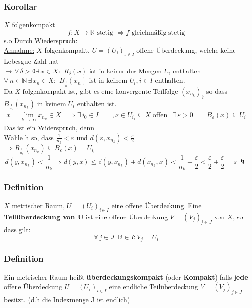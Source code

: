  \subsubsection{Korollar} %
 \label{ssub:korollar}
 $X$ folgenkompakt
 \[
 	f:X \to \mathbb{R} \text{ stetig } \Rightarrow f \text{ gleichmäßig stetig} 
 \]
  s.o
 Durch Wiederspruch: \\
 \underline{Annahme:} $X$ folgenkompakt, $U=(U_i)_{i \in I}$ offene Überdeckung, welche keine Lebesgue-Zahl hat \\
 $\Rightarrow \forall\, \delta >0 \exists\, x \in X:$ $B_{\delta}(x)$ ist in keiner der Mengen $U_i$ enthalten \\
 $\forall\, n \in \mathbb{N} \, \exists\, x_n \in X:$ $B_{\frac{1}{n}}(x_n)$ ist in keinem $U_i, i \in I$ enthalten. \\
 Da $X$ folgenkompakt ist, gibt es eine konvergente Teilfolge $(x_{n_k})_k$ so dass $B_{\frac{1}{n_k}}(x_{n_k})$ in keinem $U_i$ enthalten ist.
 \begin{align*}
 	x = \lim_{k \to \infty}x_{n_k} \in X & \Rightarrow \exists\,i_0 \in I \qquad ,x \in U_{i_0} \subseteq X \text{ offen}
	& \exists\,\varepsilon>0 \qquad B_{\varepsilon}(x) \subseteq U_{i_0}
 \end{align*}  
 Das ist ein Widerspruch, denn \\
 Wähle h so, dass $\frac{1}{n_k}< \varepsilon$ und $d(x,x_{n_k}) < \frac{\varepsilon}{2}$ \\
 $\Rightarrow B_{\frac{1}{n_k}}(x_{n_k}) \subseteq B_{\varepsilon}(x)=U_{i_0}$
 \[
 	d(y,x_{n_k})<\frac{1}{n_k} \Rightarrow d(y,x) \leq d(y,x_{n_k})+d(x_{n_k},x) < \frac{1}{n_k}+\frac{\varepsilon}{2} < \frac{\varepsilon}{2}+ \frac{\varepsilon}{2} = \varepsilon \,  \lightning
 \]
\subsubsection{Definition} %
\label{ssub:definition}
$X$ metrischer Raum, $U=(U_i)_{i \in I}$ eine offene Überdeckung. Eine {\bfseries Teilüberdeckung von U} ist eine offene Überdeckung $V=(V_j)_{j \in J}$ von $X$, so dass gilt: 
\[
	\forall\, j \in J \,\exists\,i \in I: V_j = U_i
\]
\subsubsection{Definition} %
\label{ssub:definition}
Ein metrischer Raum heißt {\bfseries überdeckungskompakt} (oder {\bfseries Kompakt}) falls {\bfseries jede} offene Überdeckung $U=(U_i)_{i \in I}$ eine endliche Teilüberdeckung $V=(V_j)_{j \in J}$ besitzt. (d.h die Indexmenge J ist endlich)
